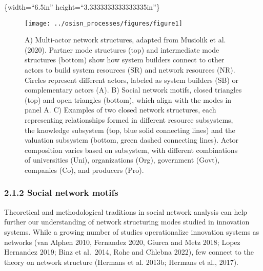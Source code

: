 \documentclass[twoside,12pt,final]{ucthesis-CA2012}
\begin{document}
\begin{ucmainmatter}
\{width=``6.5in'' height=``3.3333333333333335in''\}
\begin{figure}

{\centering \texttt{[image: ../osisn\_processes/figures/figure1]} 

}

\caption{A) Multi-actor network structures, adapted from Musiolik et al. (2020). Partner mode structures (top) and intermediate mode structures (bottom) show how system builders connect to other actors to build system resources (SR) and network resources (NR). Circles represent different actors, labeled as system builders (SB) or complementary actors (A). B) Social network motifs, closed triangles (top) and open triangles (bottom), which align with the modes in panel A. C) Examples of two closed network structures, each representing relationships formed in different resource subsystems, the knowledge subsystem (top, blue solid connecting lines) and the valuation subsystem (bottom, green dashed connecting lines). Actor composition varies based on subsystem, with different combinations of universities (Uni), organizations (Org), government (Govt), companies (Co), and producers (Pro).}\label{fig:unnamed-chunk-14}
\end{figure}
\hypertarget{social-network-motifs}{%
\subsubsection{2.1.2 Social network motifs}\label{social-network-motifs}}

Theoretical and methodological traditions in social network analysis can
help further our understanding of network structuring modes studied in
innovation systems. While a growing number of studies operationalize
innovation systems as networks (van Alphen 2010, Fernandez 2020, Giurca
and Metz 2018; Lopez Hernandez 2019; Binz et al.~2014, Rohe and Chlebna
2022), few connect to the theory on network structure (Hermans et al.
2013b; Hermans et al., 2017).


\end{ucmainmatter}
\end{document}
